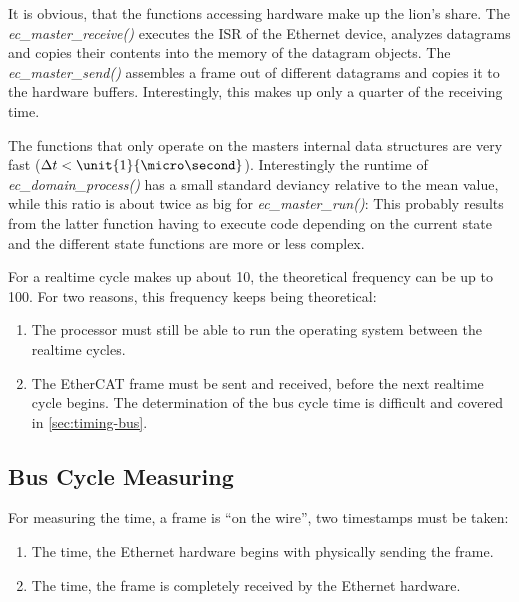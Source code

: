 \documentclass[a4paper,12pt,BCOR6mm,bibtotoc,idxtotoc]{scrbook}
\begin{document}
It is obvious, that the functions accessing hardware make up the
lion's share. The \textit{ec\_master\_receive()} executes the ISR of
the Ethernet device, analyzes datagrams and copies their contents into
the memory of the datagram objects. The \textit{ec\_master\_send()}
assembles a frame out of different datagrams and copies it to the
hardware buffers. Interestingly, this makes up only a quarter of the
receiving time.

The functions that only operate on the masters internal data structures are
very fast ($\Delta t < \unit{1}{\micro\second}$). Interestingly the runtime of
\textit{ec\_domain\_process()} has a small standard deviancy relative to the
mean value, while this ratio is about twice as big for
\textit{ec\_master\_run()}: This probably results from the latter function
having to execute code depending on the current state and the different state
functions are more or less complex.

For a realtime cycle makes up about \unit{10}{\micro\second}, the theoretical
frequency can be up to \unit{100}{\kilo\hertz}. For two reasons, this frequency
keeps being theoretical:

\begin{enumerate}

\item The processor must still be able to run the operating system between the
realtime cycles.

\item The EtherCAT frame must be sent and received, before the next realtime
cycle begins. The determination of the bus cycle time is difficult and covered
in \autoref{sec:timing-bus}.

\end{enumerate}


\subsection{Bus Cycle Measuring}
\label{sec:timing-bus}

For measuring the time, a frame is ``on the wire'', two timestamps must be
taken:

\begin{enumerate}

\item The time, the Ethernet hardware begins with physically sending the
frame.

\item The time, the frame is completely received by the Ethernet hardware.

\end{enumerate}
\end{document}
